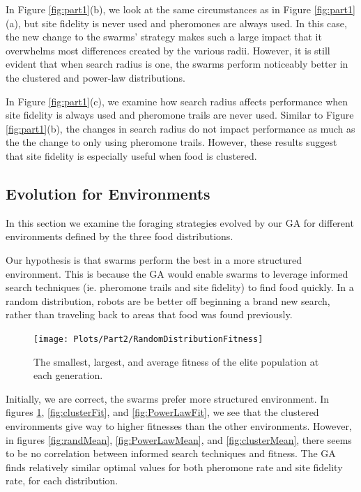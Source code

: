 \documentclass{acm_proc_article-sp}
\begin{document}
In Figure \ref{fig:part1}(b), we look at the same circumstances as in Figure \ref{fig:part1}(a), but site fidelity is never used and pheromones are always used. In this case, the new change to the swarms' strategy makes such a large impact that it overwhelms most differences created by the various radii. However, it is still evident that when search radius is one, the swarms perform noticeably better in the clustered and power-law distributions.

In Figure \ref{fig:part1}(c), we examine how search radius affects performance when site fidelity is always used and pheromone trails are never used. Similar to Figure \ref{fig:part1}(b), the changes in search radius do not impact performance as much as the the change to only using pheromone trails. However, these results suggest that site fidelity is especially useful when food is clustered.

\subsection{Evolution for Environments}

In this section we examine the foraging strategies evolved by our GA for different environments defined by the three food distributions.

Our hypothesis is that swarms perform the best in a more structured environment. This is because the GA would enable swarms to leverage informed search techniques (ie. pheromone trails and site fidelity) to find food quickly. In a random distribution, robots are be better off beginning a brand new search, rather than traveling back to areas that food was found previously.

\begin{figure}[h]
\texttt{[image: Plots/Part2/RandomDistributionFitness]}
\caption{The smallest, largest, and average fitness of the elite population at each generation.} \label{fig:randFit}
\end{figure}

Initially, we are correct, the swarms prefer more structured environment. In figures \ref{fig:randFit}, \ref{fig:clusterFit}, and \ref{fig:PowerLawFit}, we see that the clustered environments give way to higher fitnesses than the other environments. However, in figures \ref{fig:randMean}, \ref{fig:PowerLawMean}, and \ref{fig:clusterMean}, there seems to be no correlation between informed search techniques and fitness. The GA finds relatively similar optimal values for both pheromone rate and site fidelity rate, for each distribution.
\end{document}
